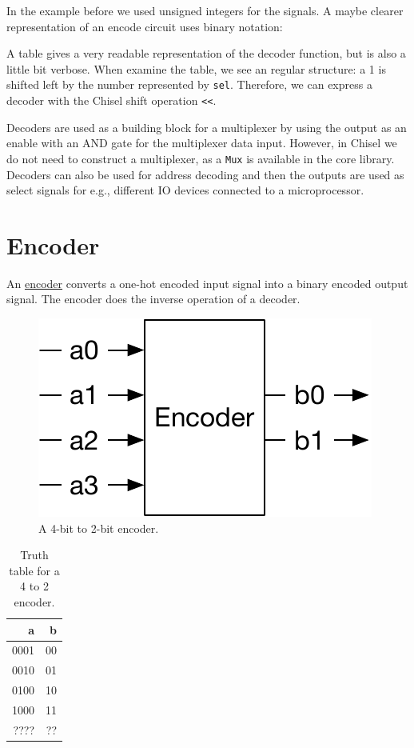 \documentclass[%
    10pt, %
    headinclude, footexclude,
    openright, %
    notitlepage,
    cleardoubleempty,
    headsepline,
    pointlessnumbers,
    bibtotoc, idxtotoc,
    ]{scrbook}
\newcommand{\code}[1]{{\small{\texttt{#1}}}}
\newcommand{\scale}{0.7}
\newcommand{\myref}[2]{\href{#1}{#2}}
\begin{document}
In the example before we used unsigned integers for the signals. A maybe clearer representation
of an encode circuit uses binary notation:



A table gives a very readable representation of the decoder function, but is also
a little bit verbose.
When examine the table, we see an regular structure: a 1 is shifted left by the number
represented by \code{sel}. Therefore, we can express a decoder with the Chisel shift
operation \code{<<}.



Decoders are used as a building block for a multiplexer by using the output as an enable
with an AND gate for the multiplexer data input. However, in Chisel we do not need to construct
a multiplexer, as a \code{Mux} is available in the core library.
Decoders can also be used for address decoding and then the outputs are used as
select signals for e.g., different IO devices connected to a microprocessor. 


\section{Encoder}

An \myref{https://en.wikipedia.org/wiki/Encoder_(digital)}{encoder}
converts a one-hot encoded input signal into a binary encoded output signal.
The encoder does the inverse operation of a decoder.

\begin{figure}
  \centering
  \includegraphics[scale=\scale]{figures/encoder}
  \caption{A 4-bit to 2-bit encoder.}
  \label{fig:encoder}
\end{figure}


\begin{table}
 \centering
 \label{tab:encoder}
  \begin{tabular}{rr}
    \toprule
    a & b \\
    \midrule
    0001 & 00 \\
    0010 & 01 \\
    0100 & 10 \\
    1000 & 11 \\
    ???? & ?? \\
    \bottomrule 
  \end{tabular} 
  \caption{Truth table for a 4 to 2 encoder.}
\end{table}
\end{document}
